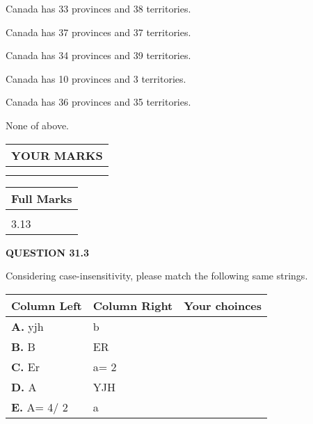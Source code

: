 \documentclass[12pt]{article}
\begin{document}
  
 
 
Canada has  %
33 provinces and  %
38 territories.
 
 
Canada has  %
37 provinces and  %
37 territories.
 
 
Canada has  %
34 provinces and  %
39 territories.
 
 
Canada has  %
10 provinces and  %
3 territories.
 
 
Canada has  %
36 provinces and  %
35 territories.
 
 
 None of above.
 
 
  
\vspace{0.2in}
  
\noindent\begin{tabular}{|l|}
\hline
 YOUR MARKS  \\
\hline
 \\ 
 \\ 
\hline
\end{tabular}
\hspace{0.05in} \begin{tabular}{|l|}
\hline
 Full Marks  \\
\hline
 \\ 
3.13 \\
\hline
\end{tabular}
{\textbf{\Large{QUESTION
31.3 
}}}
  
  
Considering case-insensitivity, please match the following same strings.
  
  
\begin{tabular}{|l|l|l|}
 \hline
 Column Left & Column Right  & Your choinces \\ 
 \hline
{\textbf{\large{
A.}}}
yjh
  & 
b
 & 
 \\ 
 \hline
{\textbf{\large{
B.}}}
B
  & 
ER
 & 
 \\ 
 \hline
{\textbf{\large{
C.}}}
Er
  & 
 a= %
2
 & 
 \\ 
 \hline
{\textbf{\large{
D.}}}
A
  & 
YJH
 & 
 \\ 
 \hline
{\textbf{\large{
E.}}}
 A= %
4/ %
2

  & 
a
 & 
 \\ 
 \hline
 \end{tabular}
  
  
 
  
\vspace{0.2in}
  
\end{document}
